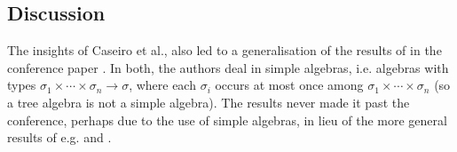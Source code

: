 \subsection{Discussion}

The insights of Caseiro et al., also led to a generalisation of the results of
\cite{marion-2003} in the conference paper \cite{marion-moyen-2000}. In both,
the authors deal in simple algebras, i.e.  algebras with types $\sigma_1 \times
\cdots \times \sigma_n \rightarrow \sigma$, where each $\sigma_i$ occurs at
most once among $\sigma_1 \times \cdots \times \sigma_n$ (so a tree algebra is
not a simple algebra).  The results never made it past the conference,
perhaps due to the use of simple algebras, in lieu of the more general results
of e.g.  \cite{aehlig-schwichtenberg-2002} and \cite{hofmann-2003}.
